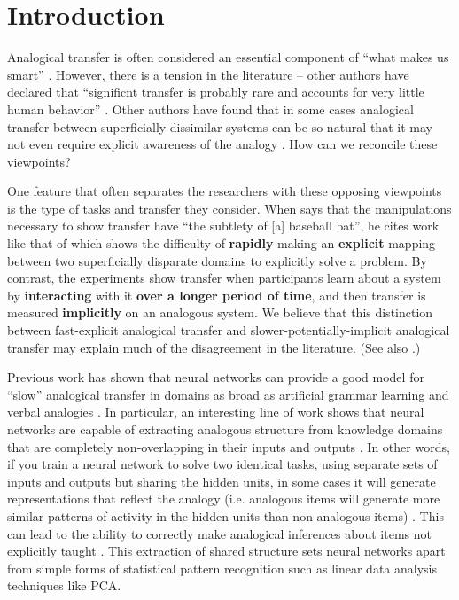 \documentclass[10pt,letterpaper]{article}
\begin{document}
\section{Introduction}
Analogical transfer is often considered an essential component of ``what makes us smart'' \citep{Gentner2003}. However, there is a tension in the literature -- other authors have declared that ``significnt transfer is probably rare and accounts for very little human behavior'' \citep{Detterman1993}. Other authors have found that in some cases analogical transfer between superficially dissimilar systems can be so natural that it may not even require explicit awareness of the analogy \citep{Day2011}. How can we reconcile these viewpoints? \par
One feature that often separates the researchers with these opposing viewpoints is the type of tasks and transfer they consider. When \citet{Detterman1993} says that the manipulations necessary to show transfer have ``the subtlety of [a] baseball bat'', he cites work like that of \citet{Gick1980} which shows the difficulty of \textbf{rapidly} making an \textbf{explicit} mapping between two superficially disparate domains to explicitly solve a problem. By contrast, the \citet{Day2011} experiments show transfer when participants learn about a system by \textbf{interacting} with it \textbf{over a longer period of time}, and then transfer is measured \textbf{implicitly} on an analogous system. We believe that this distinction between fast-explicit analogical transfer and slower-potentially-implicit analogical transfer may explain much of the disagreement in the literature. (See also \citet{Bransford1999}.)\par 
Previous work has shown that neural networks can provide a good model for ``slow'' analogical transfer in domains as broad as artificial grammar learning \citep{Dienes1999} and verbal analogies \cite{Kollias2013}. In particular, an interesting line of work shows that neural networks are capable of extracting analogous structure from knowledge domains that are completely non-overlapping in their inputs and outputs \citep{Hinton1986,Rogers2008a}. In other words, if you train a neural network to solve two identical tasks, using separate sets of inputs and outputs but sharing the hidden units, in some cases it will generate representations that reflect the analogy (i.e. analogous items will generate more similar patterns of activity in the hidden units than non-analogous items) \citep{Rogers2008a}. This can lead to the ability to correctly make analogical inferences about items not explicitly taught \citep{Hinton1986}. This extraction of shared structure sets neural networks apart from simple forms of statistical pattern recognition \citep{Rogers2008a} such as linear data analysis techniques like PCA. \par
\end{document}
